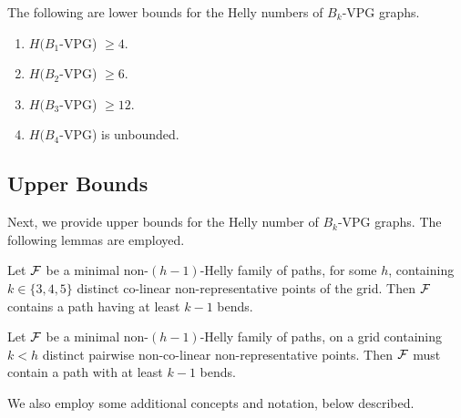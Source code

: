 \begin{claim}\label{claim:VPG-lower}
The following are lower bounds for the Helly numbers of $B_k$-VPG graphs.
\begin{enumerate}
\item $H(B_1$-VPG) $\geq 4$.
\item $H(B_2$-VPG) $\geq 6$.
\item $H(B_3$-VPG) $\geq 12$.
\item $H(B_4$-VPG) is unbounded.
\end{enumerate}
\end{claim}

\subsection{Upper Bounds}

Next, we provide upper bounds for the Helly number of $B_k$-VPG graphs. The following lemmas are employed.

\begin{lemma}\label{column-sizes}
Let $\cal F$ be a minimal non-$(h-1)$-Helly family of paths, for some $h$, containing $k \in \{3,4,5\}$ distinct co-linear non-representative points of the grid. Then $\cal F$ contains a path having at least $k-1$ bends.
\end{lemma}


\begin{lemma}\label{column-number}
Let $\cal F$ be a minimal non-$(h-1)$-Helly family of paths, on a grid containing $k < h$ distinct pairwise non-co-linear non-representative points. Then $\cal F$ must contain a path with at least $k-1$ bends.
\end{lemma}   


We also employ some additional concepts and notation, below described.

